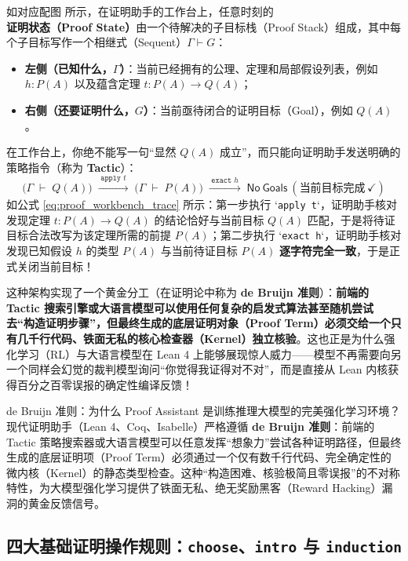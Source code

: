 \documentclass[a4paper]{article}
\begin{document}
如对应配图 所示，在证明助手的工作台上，任意时刻的\textbf{证明状态（Proof State）}由一个待解决的子目标栈（Proof Stack）组成，其中每个子目标写作一个相继式（Sequent）$\Gamma \vdash G$：
\begin{itemize}
    \item \textbf{左侧（已知什么，$\Gamma$）}：当前已经拥有的公理、定理和局部假设列表，例如 $h: P(A)$ 以及蕴含定理 $t: P(A) \to Q(A)$；
    \item \textbf{右侧（还要证明什么，$G$）}：当前亟待闭合的证明目标（Goal），例如 $Q(A)$。
\end{itemize}
在工作台上，你绝不能写一句“显然 $Q(A)$ 成立”，而只能向证明助手发送明确的策略指令（称为 \textbf{Tactic}）：
\begin{equation}
\big(\Gamma \;\vdash\; Q(A)\big) \;\xrightarrow{\;\texttt{apply } t\;}\; \big(\Gamma \;\vdash\; P(A)\big) \;\xrightarrow{\;\texttt{exact } h\;}\; \mathsf{No\ Goals\ (\text{当前目标完成}\,\checkmark)}
\label{eq:proof_workbench_trace}
\end{equation}
如公式 \eqref{eq:proof_workbench_trace} 所示：第一步执行 `\texttt{apply t}`，证明助手核对发现定理 $t: P(A) \to Q(A)$ 的结论恰好与当前目标 $Q(A)$ 匹配，于是将待证目标合法改写为该定理所需的前提 $P(A)$；第二步执行 `\texttt{exact h}`，证明助手核对发现已知假设 $h$ 的类型 $P(A)$ 与当前待证目标 $P(A)$ \textbf{逐字符完全一致}，于是正式关闭当前目标！

这种架构实现了一个黄金分工（在证明论中称为 \textbf{de Bruijn 准则}）：\textbf{前端的 Tactic 搜索引擎或大语言模型可以使用任何复杂的启发式算法甚至随机尝试去“构造证明步骤”，但最终生成的底层证明对象（Proof Term）必须交给一个只有几千行代码、铁面无私的核心检查器（Kernel）独立核验}。这也正是为什么强化学习（RL）与大语言模型在 Lean 4 上能够展现惊人威力——模型不再需要向另一个同样会幻觉的裁判模型询问“你觉得我证得对不对”，而是直接从 Lean 内核获得百分之百零误报的确定性编译反馈！

\begin{importantbox}{de Bruijn 准则：为什么 Proof Assistant 是训练推理大模型的完美强化学习环境？}
现代证明助手（Lean 4、Coq、Isabelle）严格遵循 \textbf{de Bruijn 准则}：前端的 Tactic 策略搜索器或大语言模型可以任意发挥“想象力”尝试各种证明路径，但最终生成的底层证明项（Proof Term）必须通过一个仅有数千行代码、完全确定性的微内核（Kernel）的静态类型检查。这种“构造困难、核验极简且零误报”的不对称特性，为大模型强化学习提供了铁面无私、绝无奖励黑客（Reward Hacking）漏洞的黄金反馈信号。
\end{importantbox}

\subsection{四大基础证明操作规则：\texttt{choose}、\texttt{intro} 与 \texttt{induction}}
\end{document}
